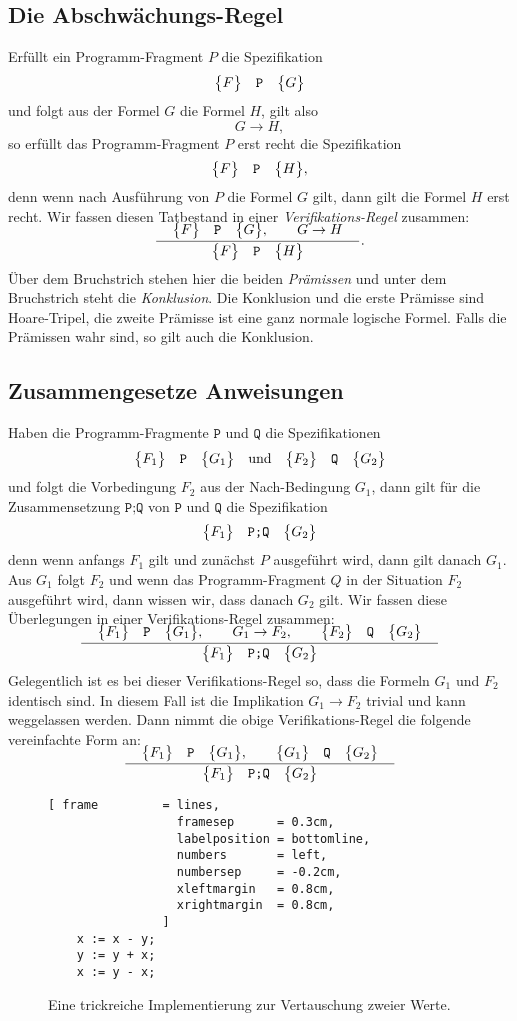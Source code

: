 \subsection{Die Abschw\"achungs-Regel}
Erf\"ullt ein Programm-Fragment $P$ die Spezifikation 
\[ \bigl\{F\bigr\}\quad\texttt{P}\quad\bigl\{G\bigr\} \]
und folgt aus der Formel $G$ die Formel $H$, gilt also
\[ G \rightarrow H, \]
so erf\"ullt das Programm-Fragment $P$ erst recht die Spezifikation 
\[ \bigl\{F\bigr\}\quad\texttt{P}\quad\bigl\{H\bigr\}, \]
denn wenn nach Ausf\"uhrung von $P$ die Formel $G$ gilt, dann gilt die Formel $H$ erst recht.
Wir fassen diesen Tatbestand in einer \emph{Verifikations-Regel} zusammen:
\\[-0.2cm]
\[ \bruch{\quad \hoare{F}{P}{G}, \qquad G \rightarrow H \quad}{\hoare{F}{P}{H}}. \]
\"Uber dem Bruchstrich stehen hier die beiden \emph{Pr\"amissen} und unter dem Bruchstrich steht
die \emph{Konklusion}.  Die Konklusion und die erste Pr\"amisse sind 
Hoare-Tripel, die zweite Pr\"amisse  ist eine ganz normale logische Formel.
Falls die Pr\"amissen wahr sind, so gilt auch die Konklusion.

\subsection{Zusammengesetze Anweisungen}
Haben die Programm-Fragmente $\texttt{P}$ und $\texttt{Q}$ die Spezifikationen
\[ \bigl\{F_1\bigr\}\quad\texttt{P}\quad\bigl\{G_1\bigr\}  \quad \mathrm{und} \quad \bigl\{F_2\bigr\}\quad\texttt{Q}\quad\bigl\{G_2\bigr\}  \]
und folgt die Vorbedingung $F_2$ aus der Nach-Bedingung $G_1$, dann gilt f\"ur die 
Zusammensetzung $\texttt{P;Q}$ von $\texttt{P}$ und $\texttt{Q}$ die
Spezifikation 
\[ \bigl\{F_1\bigr\}\quad\texttt{P;Q}\quad\bigl\{G_2\bigr\} \]
denn wenn anfangs $F_1$ gilt und zun\"achst $P$ ausgef\"uhrt wird, dann gilt danach $G_1$.
Aus $G_1$ folgt $F_2$ und wenn das Programm-Fragment $Q$ in der Situation $F_2$ ausgef\"uhrt
wird, dann wissen wir, dass danach $G_2$ gilt.
Wir fassen diese \"Uberlegungen in einer Verifikations-Regel zusammen:
\\[-0.2cm]
\[ \bruch{\quad\hoare{F_1}{P}{G_1}, \qquad G_1 \rightarrow F_2, \qquad \hoare{F_2}{Q}{G_2}\quad}{
    \hoare{F_1}{P;Q}{G_2}} \]
Gelegentlich ist es bei dieser Verifikations-Regel so, 
dass die Formeln $G_1$ und $F_2$  identisch sind.  In diesem Fall ist die Implikation
$G_1 \rightarrow F_2$ trivial und kann weggelassen werden.  Dann nimmt die obige
Verifikations-Regel die folgende vereinfachte Form an:
\\[-0.2cm]
\[ \bruch{\quad\hoare{F_1}{P}{G_1}, \qquad \hoare{G_1}{Q}{G_2}\quad}{ \hoare{F_1}{P;Q}{G_2}} \]

\begin{figure}[!ht]
\centering
\begin{Verbatim}[ frame         = lines, 
                  framesep      = 0.3cm, 
                  labelposition = bottomline,
                  numbers       = left,
                  numbersep     = -0.2cm,
                  xleftmargin   = 0.8cm,
                  xrightmargin  = 0.8cm,
                ]
    x := x - y;
    y := y + x;
    x := y - x;
\end{Verbatim}
\vspace*{-0.3cm}
\caption{Eine trickreiche Implementierung zur Vertauschung zweier Werte.}
\label{fig:swap}
\end{figure}

